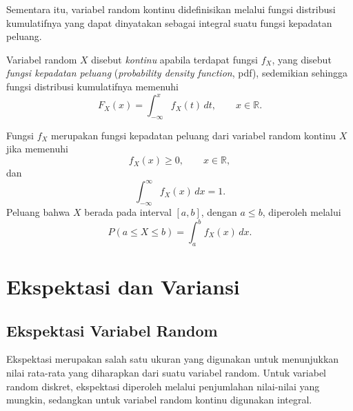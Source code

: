 Sementara itu, variabel random kontinu didefinisikan melalui fungsi
distribusi kumulatifnya yang dapat dinyatakan sebagai integral suatu
fungsi kepadatan peluang.

\begin{definisi}
\label{def:varkontinu}
Variabel random $X$ disebut \textit{kontinu} apabila terdapat fungsi
$f_X$, yang disebut \textit{fungsi kepadatan peluang}
(\textit{probability density function}, pdf), sedemikian sehingga
fungsi distribusi kumulatifnya memenuhi
\begin{equation}
    F_X(x)=\int_{-\infty}^{x}f_X(t)\,dt,
    \qquad x\in\mathbb{R}.
    \label{eq:cdfkontinu}
\end{equation}
\end{definisi}

\begin{definisi}
\label{def:pdfkontinu}
Fungsi $f_X$ merupakan fungsi kepadatan peluang dari variabel random
kontinu $X$ jika memenuhi
\begin{equation}
    f_X(x)\geq 0,\qquad x\in\mathbb{R},
    \label{eq:nonnegatifpdf}
\end{equation}
dan
\begin{equation}
    \int_{-\infty}^{\infty}f_X(x)\,dx=1.
    \label{eq:syaratpdf}
\end{equation}
Peluang bahwa $X$ berada pada interval $[a,b]$, dengan $a\leq b$,
diperoleh melalui
\begin{equation}
    P(a\leq X\leq b)=\int_a^b f_X(x)\,dx.
    \label{eq:peluangintervalkontinu}
\end{equation}
\end{definisi}


\section{Ekspektasi dan Variansi}

\label{sec:ekspektasi}

\subsection{Ekspektasi Variabel Random}

\label{subsec:hargaharapan}

Ekspektasi merupakan salah satu ukuran yang digunakan untuk menunjukkan nilai
rata-rata yang diharapkan dari suatu variabel random. Untuk variabel random
diskret, ekspektasi diperoleh melalui penjumlahan nilai-nilai yang mungkin,
sedangkan untuk variabel random kontinu digunakan integral.

